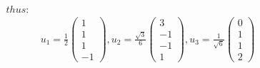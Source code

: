 \documentclass[UTF8,12pt, a4paper]{ctexart}
\begin{document}
\begin{align*}
  thus: \\
  &\  u_1=\frac{1}{2}
  \left(
    \begin{matrix}
      1 \\ 1\\ 1\\ -1
    \end{matrix}
  \right),
  u_2=\frac{\sqrt{3}}{6} 
  \left(
    \begin{matrix}
      3 \\ -1 \\ -1 \\ 1
    \end{matrix}  
  \right) ,
  u_3=\frac{1}{\sqrt{6}} 
  \left(
    \begin{matrix}
      0 \\ 1 \\ 1 \\ 2
    \end{matrix}  
  \right)
\end{align*}
\end{document}
